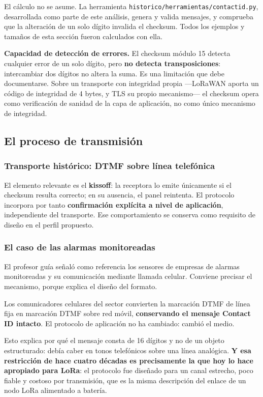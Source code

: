 \begin{cajaclave}[title={Verificación empírica}]
El cálculo no se asume. La herramienta \texttt{historico/herramientas/contactid.py}, desarrollada como
parte de este análisis, genera y valida mensajes, y comprueba que la alteración de un solo dígito
invalida el checksum. Todos los ejemplos y tamaños de esta sección fueron calculados con ella.
\end{cajaclave}

\textbf{Capacidad de detección de errores.} El checksum módulo 15 detecta cualquier error de un solo
dígito, pero \textbf{no detecta transposiciones}: intercambiar dos dígitos no altera la suma. Es una
limitación que debe documentarse. Sobre un transporte con integridad propia ---LoRaWAN aporta un código
de integridad de 4 bytes, y TLS su propio mecanismo--- el checksum opera como verificación de sanidad de
la capa de aplicación, no como único mecanismo de integridad.

\subsection{El proceso de transmisión}

\subsubsection{Transporte histórico: DTMF sobre línea telefónica}



El elemento relevante es el \textbf{kissoff}: la receptora lo emite únicamente si el checksum resulta
correcto; en su ausencia, el panel reintenta. El protocolo incorpora por tanto \textbf{confirmación
explícita a nivel de aplicación}, independiente del transporte. Ese comportamiento se conserva como
requisito de diseño en el perfil propuesto.

\subsubsection{El caso de las alarmas monitoreadas}

El profesor guía señaló como referencia los sensores de empresas de alarmas monitoreadas y su
comunicación mediante llamada celular. Conviene precisar el mecanismo, porque explica el diseño del
formato.

\begin{cajaclave}[title={La comunicación celular es un cambio de transporte, no de protocolo}]
Los comunicadores celulares del sector convierten la marcación DTMF de línea fija en marcación DTMF
sobre red móvil, \textbf{conservando el mensaje Contact ID intacto}. El protocolo de aplicación no ha
cambiado: cambió el medio.

Esto explica por qué el mensaje consta de 16 dígitos y no de un objeto estructurado: debía caber en
tonos telefónicos sobre una línea analógica. \textbf{Y esa restricción de hace cuatro décadas es
precisamente la que hoy lo hace apropiado para LoRa}: el protocolo fue diseñado para un canal estrecho,
poco fiable y costoso por transmisión, que es la misma descripción del enlace de un nodo LoRa
alimentado a batería.
\end{cajaclave}

